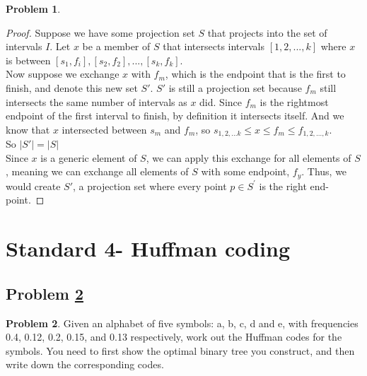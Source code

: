 \documentclass[11pt]{article}
\theoremstyle{definition}
\theoremstyle{definition}
\newtheorem{required}{Problem}
\theoremstyle{definition}
\begin{document}
\begin{required}
\begin{enumerate}[label=(\alph*)]
\begin{proof}
Suppose we have some projection set $S$ that projects into the set of intervals $I$. Let $x$ be a member of $S$ that intersects intervals $[1, 2, ..., k]$ where $x$ is between $[s_1, f_i], [s_2, f_2], ... , [s_k, f_k]$. \\

Now suppose we exchange $x$ with $f_m$, which is the endpoint that is the first to finish, and denote this new set $S'$. $S'$ is still a projection set because $f_m$ still intersects the same number of intervals as $x$ did. Since $f_m$ is the rightmost endpoint of the first interval to finish, by definition it intersects itself. And we know that $x$ intersected between $s_m$ and $f_m$, so $s_{1,2,...k} \leq x \leq f_m \leq f_{1,2,...,k}$. \\
So $|S'| = |S|$\\


Since $x$ is a generic element of $S$, we can apply this exchange for all elements of $S$, meaning we can exchange all elements of $S$ with some endpoint, $f_{y}$. Thus, we would create $S'$, a projection set where every point $p \in S^{\prime}$ is the right end-point.

\end{proof}

\end{enumerate}
\end{required}

\newpage
\section{Standard 4- Huffman coding}
\subsection{Problem \ref{Huffman}}
\begin{required} \label{Huffman}
Given an alphabet of five symbols: a, b, c, d and e, with frequencies 0.4, 0.12, 0.2, 0.15, and 0.13
respectively, work out the Huffman codes for the symbols. You need to first show the optimal binary tree you construct, and then write down the corresponding codes. \\
\end{required}
\end{document}
